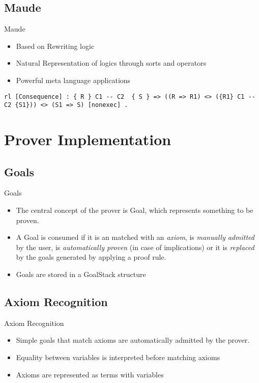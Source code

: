 \documentclass{beamer}
\begin{document}
\subsection{Maude}
\begin{frame}[fragile]{Maude}
\begin{itemize}
	\item Based on Rewriting logic
	\item {Natural Representation of logics through sorts and operators}
	\item Powerful meta language applications
\end{itemize}
\begin{example}
	\begin{lstlisting}
rl [Consequence] : { R } C1 -- C2  { S } => ((R => R1) <> ({R1} C1 -- C2 {S1})) <> (S1 => S) [nonexec] .
\end{lstlisting}
\end{example}
\end{frame}

\section{Prover Implementation}
\subsection{Goals}
\begin{frame}{Goals}
\begin{itemize}
	\item The central concept of the prover is \alert{Goal}, which represents something to be proven.
	\item A \alert{Goal} is consumed if it is an matched with an \textit{axiom}, is \textit{manually admitted} by the user, is \textit{automatically proven} (in case of implications) or it is \textit{replaced} by the goals generated by applying a proof rule. 
	\item Goals are stored in a \alert{GoalStack} structure
\end{itemize}
\end{frame}

\subsection{Axiom Recognition}
\begin{frame}{Axiom Recognition}
\begin{itemize}
	\item Simple goals that match \alert{axioms} are automatically admitted by the prover.
	\item Equality between variables is \alert{interpreted} before matching axioms
	\item Axioms are represented as terms with variables
\end{itemize}
\end{frame}
\end{document}
